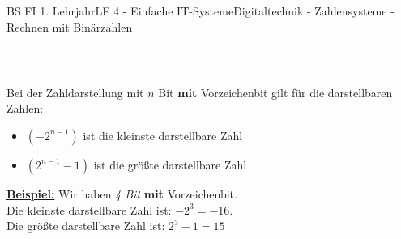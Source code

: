 \documentclass[11pt,twocolumn,oneside,openany,headings=optiontotoc,11pt,numbers=noenddot]{article}
\begin{document}
\begin{worksheet}{BS FI 1. Lehrjahr}{LF 4 - Einfache IT-Systeme}{Digitaltechnik - Zahlensysteme - Rechnen mit Binärzahlen}
\begin{tabularx}{0.48\textwidth}{c|lll||rrr|c}
		\end{tabularx}\\
		\par\noindent
		\begin{framed}
			\noindent
			Bei der Zahldarstellung mit \(n\) Bit \textbf{mit} Vorzeichenbit gilt für die darstellbaren Zahlen:
			\begin{itemize}
				\item[] \((-2^{n-1})\) ist die kleinste darstellbare Zahl
				\item[] \((2^{n-1}-1)\) ist die größte darstellbare Zahl
			\end{itemize}
		\end{framed}
		\par\noindent
		\textbf{\underline{Beispiel:}} Wir haben \textit{4 Bit} \textbf{mit} Vorzeichenbit.\\
		Die kleinste darstellbare Zahl ist: \(-2^3 = -16\).\\
		Die größte darstellbare Zahl ist: \(2^3-1 = 15\)
	\end{worksheet}
\end{document}
